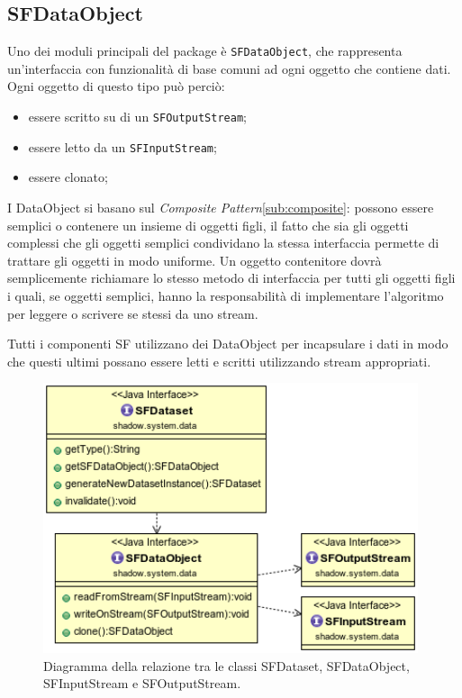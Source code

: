 \subsection{SFDataObject}
\label{sub:sfdataobject}
Uno dei moduli principali del package \`e \texttt{SFDataObject}, che rappresenta un'interfaccia con funzionalit\`a di base comuni ad ogni oggetto che contiene dati. 
Ogni oggetto di questo tipo pu\`o perci\`o:
\begin{itemize}
	\item essere scritto su di un \texttt{SFOutputStream};
	\item essere letto da un \texttt{SFInputStream};
	\item essere clonato;
\end{itemize}
I DataObject si basano sul \textit{Composite Pattern}\ref{sub:composite}: possono essere semplici o contenere un insieme di oggetti figli, il fatto che sia gli oggetti complessi che gli oggetti semplici condividano la stessa interfaccia permette di trattare gli oggetti in modo uniforme. Un oggetto contenitore dovr\`a semplicemente richiamare lo stesso metodo di interfaccia per tutti gli oggetti figli i quali, se oggetti semplici, hanno la responsabilit\`a di implementare l'algoritmo per leggere o scrivere se stessi da uno stream.

Tutti i componenti SF utilizzano dei DataObject per incapsulare i dati in modo che questi ultimi possano essere letti e scritti utilizzando stream appropriati.

\begin{figure}
\begin{center}
\includegraphics[width=11cm]{Immagini/relazione-dataset-dataobject-stream}
\caption{Diagramma della relazione tra le classi SFDataset, SFDataObject, SFInputStream e SFOutputStream.\label{f:dataset-dataobj-stream}} 
\end{center} 
\end{figure}

